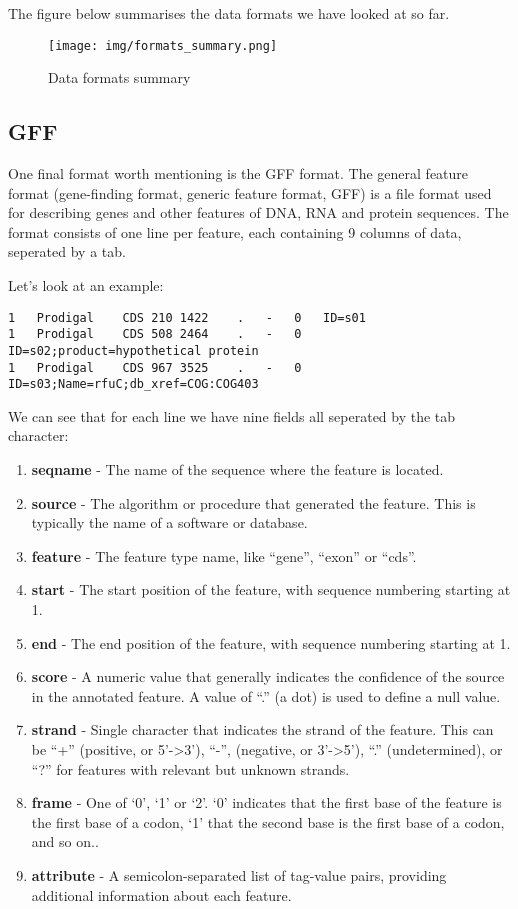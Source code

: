 \documentclass[11pt]{article}
\providecommand{\tightlist}{%
      \setlength{\itemsep}{0pt}\setlength{\parskip}{0pt}}
\begin{document}
The figure below summarises the data formats we have looked at so far.

    \begin{figure}
\centering
\texttt{[image: img/formats\_summary.png]}
\caption{Data formats summary}
\end{figure}

    \hypertarget{gff}{%
\subsection{GFF}\label{gff}}

One final format worth mentioning is the GFF format. The general feature
format (gene-finding format, generic feature format, GFF) is a file
format used for describing genes and other features of DNA, RNA and
protein sequences. The format consists of one line per feature, each
containing 9 columns of data, seperated by a tab.

Let's look at an example:

\begin{verbatim}
1   Prodigal    CDS 210 1422    .   -   0   ID=s01
1   Prodigal    CDS 508 2464    .   -   0   ID=s02;product=hypothetical protein
1   Prodigal    CDS 967 3525    .   -   0   ID=s03;Name=rfuC;db_xref=COG:COG403
\end{verbatim}

We can see that for each line we have nine fields all seperated by the
tab character:

\begin{enumerate}
\def\labelenumi{\arabic{enumi}.}
\tightlist
\item
  \textbf{seqname} - The name of the sequence where the feature is
  located.
\item
  \textbf{source} - The algorithm or procedure that generated the
  feature. This is typically the name of a software or database.
\item
  \textbf{feature} - The feature type name, like ``gene'', ``exon'' or
  ``cds''.
\item
  \textbf{start} - The start position of the feature, with sequence
  numbering starting at 1.
\item
  \textbf{end} - The end position of the feature, with sequence
  numbering starting at 1.
\item
  \textbf{score} - A numeric value that generally indicates the
  confidence of the source in the annotated feature. A value of ``.'' (a
  dot) is used to define a null value.
\item
  \textbf{strand} - Single character that indicates the strand of the
  feature. This can be ``+'' (positive, or 5'-\textgreater3'), ``-'',
  (negative, or 3'-\textgreater5'), ``.'' (undetermined), or ``?'' for
  features with relevant but unknown strands.
\item
  \textbf{frame} - One of `0', `1' or `2'. `0' indicates that the first
  base of the feature is the first base of a codon, `1' that the second
  base is the first base of a codon, and so on..
\item
  \textbf{attribute} - A semicolon-separated list of tag-value pairs,
  providing additional information about each feature.
\end{enumerate}
\end{document}
